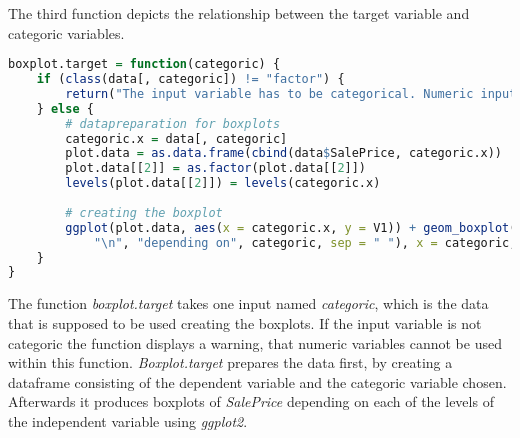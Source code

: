 The third function depicts the relationship between the target variable and categoric variables. 
\begin{lstlisting}[language=R]
boxplot.target = function(categoric) {
    if (class(data[, categoric]) != "factor") {
        return("The input variable has to be categorical. Numeric input does not work!")
    } else {
        # datapreparation for boxplots
        categoric.x = data[, categoric]
        plot.data = as.data.frame(cbind(data$SalePrice, categoric.x))
        plot.data[[2]] = as.factor(plot.data[[2]])
        levels(plot.data[[2]]) = levels(categoric.x)
        
        # creating the boxplot
        ggplot(plot.data, aes(x = categoric.x, y = V1)) + geom_boxplot() + labs(title = paste("Boxplots of SalePrice", 
            "\n", "depending on", categoric, sep = " "), x = categoric, y = "SalePrice") + theme_classic()
    }
}
\end{lstlisting}
The function \textit{boxplot.target} takes one input named \textit{categoric}, which is the data that is supposed to be used creating the boxplots. If the input variable is not categoric the function displays a warning, that numeric variables cannot be used within this function. \textit{Boxplot.target} prepares the data first, by creating a dataframe consisting of the dependent variable and the categoric variable chosen. Afterwards it produces boxplots of \textit{SalePrice} depending on each of the levels of the independent variable using \textit{ggplot2}.
